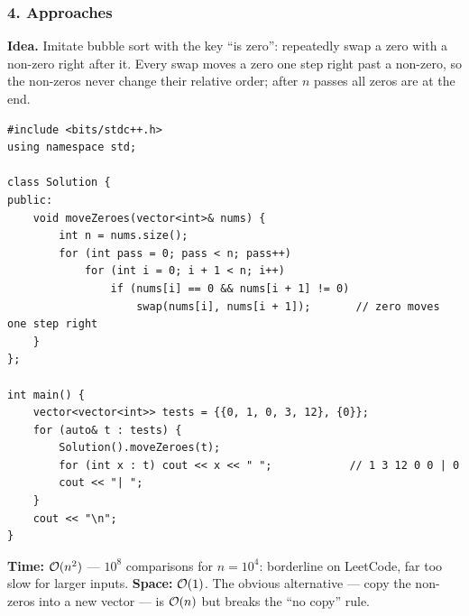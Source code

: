 \subsubsection*{4. Approaches}

\begin{bruteforcebox}
\textbf{Idea.} Imitate bubble sort with the key ``is zero'': repeatedly swap a zero with a non-zero right after it. Every swap moves a zero one step right past a non-zero, so the non-zeros never change their relative order; after $n$ passes all zeros are at the end.
\begin{lstlisting}[style=cpp]
#include <bits/stdc++.h>
using namespace std;

class Solution {
public:
    void moveZeroes(vector<int>& nums) {
        int n = nums.size();
        for (int pass = 0; pass < n; pass++)
            for (int i = 0; i + 1 < n; i++)
                if (nums[i] == 0 && nums[i + 1] != 0)
                    swap(nums[i], nums[i + 1]);       // zero moves one step right
    }
};

int main() {
    vector<vector<int>> tests = {{0, 1, 0, 3, 12}, {0}};
    for (auto& t : tests) {
        Solution().moveZeroes(t);
        for (int x : t) cout << x << " ";            // 1 3 12 0 0 | 0
        cout << "| ";
    }
    cout << "\n";
}
\end{lstlisting}
\begin{complexitybox}
\textbf{Time:} $\mathcal{O}(n^2)$ --- $10^8$ comparisons for $n = 10^4$: borderline \ac{} on LeetCode, far too slow for larger inputs. \textbf{Space:} $\mathcal{O}(1)$. The obvious alternative --- copy the non-zeros into a new vector --- is $\mathcal{O}(n)$ but breaks the ``no copy'' rule.
\end{complexitybox}
\end{bruteforcebox}

